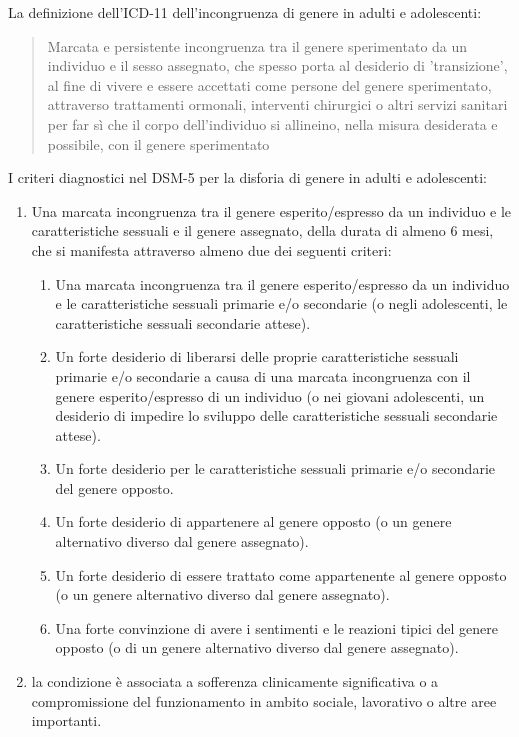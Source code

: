 \documentclass[11pt]{article}
\begin{document}
La definizione dell'ICD-11 dell'incongruenza di genere in adulti e adolescenti:

\begin{quote}
Marcata e persistente  incongruenza tra il genere sperimentato da un individuo e il sesso assegnato, che spesso porta  al desiderio di 'transizione', al fine di vivere e essere accettati come persone del genere  sperimentato, attraverso trattamenti ormonali, interventi chirurgici o altri servizi sanitari per far sì  che il corpo dell'individuo si allineino, nella misura desiderata e possibile, con il genere  sperimentato
\end{quote}

I criteri diagnostici nel DSM-5 per la disforia di genere in adulti e adolescenti:
\begin{enumerate}
\item Una marcata incongruenza tra il genere esperito/espresso da un individuo e  le caratteristiche sessuali e il genere assegnato, della durata di almeno 6 mesi, che si  manifesta attraverso almeno due dei seguenti criteri:
\begin{enumerate}
\item Una marcata incongruenza tra il genere esperito/espresso da un individuo e le  caratteristiche sessuali primarie e/o secondarie (o negli adolescenti, le  caratteristiche sessuali secondarie attese).
\item Un forte desiderio di liberarsi delle proprie caratteristiche sessuali primarie e/o  secondarie  a  causa  di  una  marcata  incongruenza  con  il  genere  esperito/espresso di un individuo (o nei giovani adolescenti, un desiderio di  impedire lo sviluppo delle caratteristiche sessuali secondarie attese).
\item Un forte desiderio per le caratteristiche sessuali primarie e/o secondarie del  genere opposto.
\item Un forte desiderio di appartenere al genere opposto (o un genere alternativo  diverso dal genere assegnato).
\item Un forte desiderio di essere trattato come appartenente al genere opposto (o un  genere alternativo diverso dal genere assegnato).
\item Una forte convinzione di avere i sentimenti e le reazioni tipici del genere opposto  (o di un genere alternativo diverso dal genere assegnato).
\end{enumerate}
\item la condizione è associata a sofferenza clinicamente significativa o a  compromissione del funzionamento in ambito sociale, lavorativo o altre aree  importanti.
\end{enumerate}
\end{document}
